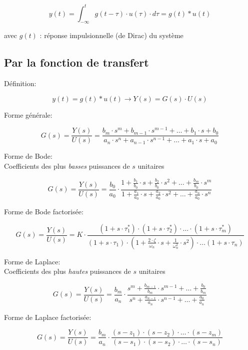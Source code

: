 \documentclass[10pt, twocolumn]{article}
\begin{document}
			\[y(t)=\int_{-\infty}^{t} g(t-\tau) \cdot u(\tau) \cdot d \tau=g(t) * u(t)\]
			
			avec $g(t)$ : réponse impulsionnelle (de Dirac) du système
		
		\subsection*{Par la fonction de transfert}
		
			Définition:
			
			\[y(t)=g(t) * u(t) \longrightarrow Y(s)=G(s) \cdot U(s)\]
			
			Forme générale:
			
			\[G(s)=\frac{Y(s)}{U(s)}=\frac{b_{m} \cdot s^{m}+b_{m-1} \cdot s^{m-1}+\ldots+b_{1} \cdot s+b_{0}}{a_{n} \cdot s^{n}+a_{n-1} \cdot s^{n-1}+\ldots+a_{1} \cdot s+a_{0}}\]
			
			Forme de Bode:\\
			Coefficients des plus \emph{basses} puissances de $s$ unitaires
			
			\[G(s)=\frac{Y(s)}{U(s)}=\frac{b_{0}}{a_{0}} \cdot \frac{1+\frac{b_{1}}{b_{0}} \cdot s+\frac{b_{2}}{b_{0}} \cdot s^{2}+\ldots+\frac{b_{m}}{b_{0}} \cdot s^{m}}{1+\frac{a_{1}}{a_{0}} \cdot s+\frac{a_{2}}{a_{0}} \cdot s^{2}+\ldots+\frac{a_{n}}{a_{0}} \cdot s^{n}}\]
			
			Forme de Bode factorisée:
			
			\[G(s)=\frac{Y(s)}{U(s)}=K \cdot \frac{\left(1+s \cdot \tau_{1}^{*}\right) \cdot\left(1+s \cdot \tau_{2}^{*}\right) \cdot \ldots \cdot\left(1+s \cdot \tau_{m}^{*}\right)}{\left(1+s \cdot \tau_{1}\right) \cdot\left(1+\frac{2 \cdot \zeta}{\omega_{n}} \cdot s+\frac{1}{\omega_{n}^{2}} \cdot s^{2}\right) \cdot \ldots\left(1+s \cdot \tau_{n}\right)}\]
			
			Forme de Laplace: \\ 
			Coefficients des plus \emph{hautes} puissances de $s$ unitaires
			
			\[G(s)=\frac{Y(s)}{U(s)}=\frac{b_{m}}{a_{n}} \cdot \frac{s^{m}+\frac{b_{m-1}}{b_{m}} \cdot s^{m-1}+\ldots+\frac{b_{0}}{b_{m}}}{s^{n}+\frac{a_{n-1}}{a_{n}} \cdot s^{n-1}+\ldots+\frac{a_{0}}{a_{n}}}\]
			
			Forme de Laplace factorisée:
			
			\[G(s)=\frac{Y(s)}{U(s)}=\frac{b_{m}}{a_{n}} \cdot \frac{\left(s-z_{1}\right) \cdot\left(s-z_{2}\right) \cdot \ldots \cdot\left(s-z_{m}\right)}{\left(s-s_{1}\right) \cdot\left(s-s_{2}\right) \cdot \ldots \cdot\left(s-s_{n}\right)}\]
			
\end{document}

